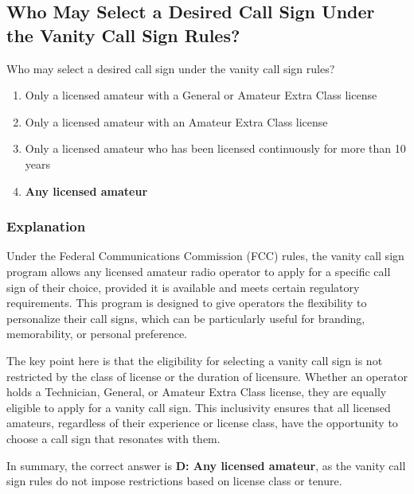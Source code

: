 \subsection{Who May Select a Desired Call Sign Under the Vanity Call Sign Rules?}
\label{T1C02}

\begin{tcolorbox}[colback=gray!10!white,colframe=black!75!black,title=T1C02]
Who may select a desired call sign under the vanity call sign rules?
\begin{enumerate}[label=\Alph*]
    \item Only a licensed amateur with a General or Amateur Extra Class license
    \item Only a licensed amateur with an Amateur Extra Class license
    \item Only a licensed amateur who has been licensed continuously for more than 10 years
    \item \textbf{Any licensed amateur}
\end{enumerate}
\end{tcolorbox}

\subsubsection{Explanation}
Under the Federal Communications Commission (FCC) rules, the vanity call sign program allows any licensed amateur radio operator to apply for a specific call sign of their choice, provided it is available and meets certain regulatory requirements. This program is designed to give operators the flexibility to personalize their call signs, which can be particularly useful for branding, memorability, or personal preference.

The key point here is that the eligibility for selecting a vanity call sign is not restricted by the class of license or the duration of licensure. Whether an operator holds a Technician, General, or Amateur Extra Class license, they are equally eligible to apply for a vanity call sign. This inclusivity ensures that all licensed amateurs, regardless of their experience or license class, have the opportunity to choose a call sign that resonates with them.

In summary, the correct answer is \textbf{D: Any licensed amateur}, as the vanity call sign rules do not impose restrictions based on license class or tenure.

